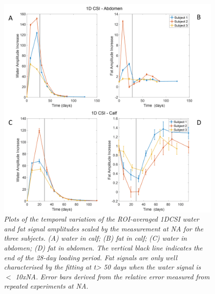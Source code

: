 \documentclass[class=article, crop=false]{standalone}
\begin{document}
\begin{figure}
    \centering
    \includegraphics[width=1\textwidth]{Figures/Lipid/1DCSI_Amplitude.png}
    \caption{\textit{Plots of the temporal variation of the ROI-averaged 1DCSI water and fat signal amplitudes scaled by the measurement at NA for the three subjects. (A) water in calf; (B) fat in calf; (C) water in abdomen; (D) fat in abdomen. The vertical black line indicates the end of the 28-day loading period. Fat signals are only well characterised by the fitting at t> 50 days when the water signal is $<$ 10xNA.  Error bars derived from the relative error measured from repeated experiments at NA.}}
    \label{fig:Lip:1DCSI}
\end{figure}
\end{document}
